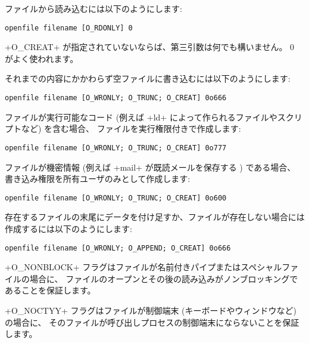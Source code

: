 \begin{example}
ファイルから読み込むには以下のようにします:
%
\begin{lstlisting}
openfile filename [O_RDONLY] 0
\end{lstlisting}
%
\ml+O_CREAT+ が指定されていないならば、第三引数は何でも構いません。 0 がよく使われます。

それまでの内容にかかわらず空ファイルに書き込むには以下のようにします:
%
\begin{lstlisting}
openfile filename [O_WRONLY; O_TRUNC; O_CREAT] 0o666
\end{lstlisting}
%
ファイルが実行可能なコード (例えば \ml+ld+ によって作られるファイルやスクリプトなど) を含む場合、
ファイルを実行権限付きで作成します:
%
\begin{lstlisting}
openfile filename [O_WRONLY; O_TRUNC; O_CREAT] 0o777
\end{lstlisting}
%
ファイルが機密情報 (例えば \ml+mail+ が既読メールを保存する ) である場合、
書き込み権限を所有ユーザのみとして作成します:
%
\begin{lstlisting}
openfile filename [O_WRONLY; O_TRUNC; O_CREAT] 0o600
\end{lstlisting}
%
存在するファイルの末尾にデータを付け足すか、ファイルが存在しない場合には作成するには以下のようにします:
%
\begin{lstlisting}
openfile filename [O_WRONLY; O_APPEND; O_CREAT] 0o666
\end{lstlisting}
\end{example}

\ml+O_NONBLOCK+ フラグはファイルが名前付きパイプまたはスペシャルファイルの場合に、
ファイルのオープンとその後の読み込みがノンブロッキングであることを保証します。

\ml+O_NOCTYY+ フラグはファイルが制御端末 (キーボードやウィンドウなど) の場合に、
そのファイルが呼び出しプロセスの制御端末にならないことを保証します。

